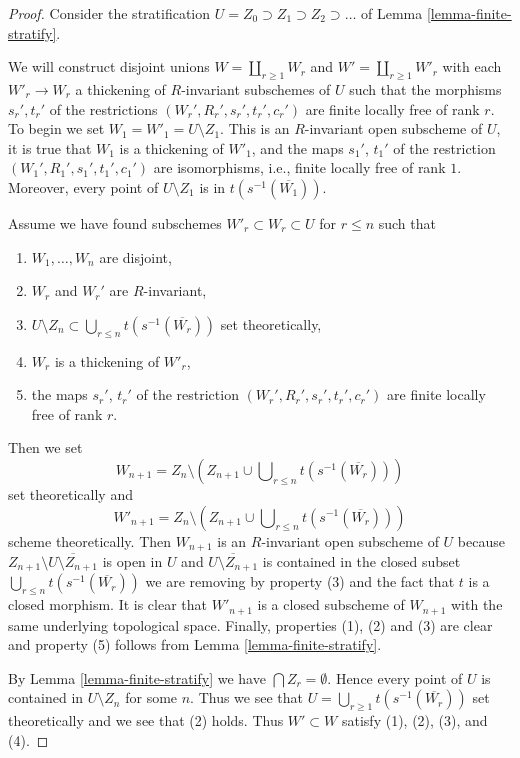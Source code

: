 \begin{proof}
Consider the stratification $U = Z_0 \supset Z_1 \supset Z_2 \supset \ldots$
of Lemma \ref{lemma-finite-stratify}.

\medskip\noindent
We will construct disjoint unions $W = \coprod_{r \geq 1} W_r$ and
$W' = \coprod_{r \geq 1} W'_r$ with each $W'_r \to W_r$ a thickening
of $R$-invariant subschemes of $U$ such that the morphisms
$s_r', t_r'$ of the restrictions $(W_r', R_r', s_r', t_r', c_r')$
are finite locally free of rank $r$. To begin we set
$W_1 = W'_1 = U \setminus Z_1$. This is an $R$-invariant open
subscheme of $U$, it is true that $W_1$ is a thickening of $W'_1$,
and the maps $s_1'$, $t_1'$ of the
restriction $(W_1', R_1', s_1', t_1', c_1')$ are isomorphisms, i.e.,
finite locally free of rank $1$.
Moreover, every point of $U \setminus Z_1$ is in $t(s^{-1}(\overline{W_1}))$.

\medskip\noindent
Assume we have found subschemes $W'_r \subset W_r \subset U$ for $r \leq n$
such that
\begin{enumerate}
\item $W_1, \ldots, W_n$ are disjoint,
\item $W_r$ and $W_r'$ are $R$-invariant,
\item $U \setminus Z_n \subset \bigcup_{r \leq n} t(s^{-1}(\overline{W_r}))$
set theoretically,
\item $W_r$ is a thickening of $W'_r$,
\item the maps $s_r'$, $t_r'$ of the restriction
$(W_r', R_r', s_r', t_r', c_r')$ are finite locally free of rank $r$.
\end{enumerate}
Then we set
$$
W_{n + 1} = Z_n \setminus
\left(
Z_{n + 1} \cup \bigcup\nolimits_{r \leq n} t(s^{-1}(\overline{W_r}))
\right)
$$
set theoretically and
$$
W'_{n + 1} = Z_n \setminus
\left(
Z_{n + 1} \cup \bigcup\nolimits_{r \leq n} t(s^{-1}(\overline{W_r}))
\right)
$$
scheme theoretically. Then $W_{n + 1}$ is an $R$-invariant open subscheme
of $U$ because $Z_{n + 1} \setminus \overline{U \setminus Z_{n + 1}}$
is open in $U$ and $\overline{U \setminus Z_{n + 1}}$ is contained
in the closed subset $\bigcup\nolimits_{r \leq n} t(s^{-1}(\overline{W_r}))$
we are removing by property (3) and the fact that $t$ is a closed morphism.
It is clear that $W'_{n + 1}$ is a closed subscheme
of $W_{n + 1}$ with the same underlying topological space.
Finally, properties (1), (2) and (3) are clear and property (5) follows from
Lemma \ref{lemma-finite-stratify}.

\medskip\noindent
By Lemma \ref{lemma-finite-stratify} we have $\bigcap Z_r = \emptyset$.
Hence every point of $U$ is contained in $U \setminus Z_n$
for some $n$. Thus we see that
$U = \bigcup_{r \geq 1} t(s^{-1}(\overline{W_r}))$
set theoretically and we see that (2) holds.
Thus $W' \subset W$ satisfy (1), (2), (3), and (4).
\end{proof}

